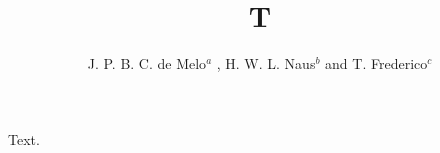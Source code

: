\documentclass{revtex4}
\begin{document}
\title{T}
\author{J. P. B. C. de Melo$^a$ , H. W. L. Naus$^b$ and T. Frederico$^c$}
\maketitle
Text.
\end{document}
